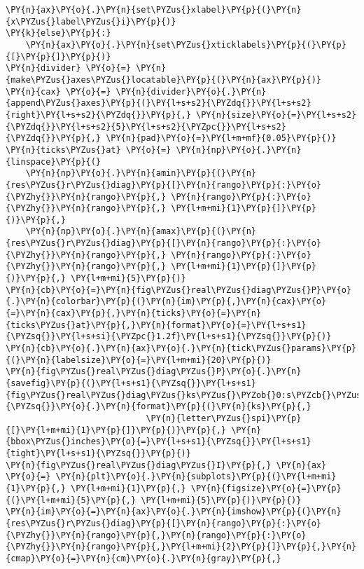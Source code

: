 \begin{Verbatim}[commandchars=\\\{\}]
    \PY{n}{ax}\PY{o}{.}\PY{n}{set\PYZus{}xlabel}\PY{p}{(}\PY{n}{x\PYZus{}label\PYZus{}i}\PY{p}{)}
\PY{k}{else}\PY{p}{:}
    \PY{n}{ax}\PY{o}{.}\PY{n}{set\PYZus{}xticklabels}\PY{p}{(}\PY{p}{[}\PY{p}{]}\PY{p}{)}
\PY{n}{divider} \PY{o}{=} \PY{n}{make\PYZus{}axes\PYZus{}locatable}\PY{p}{(}\PY{n}{ax}\PY{p}{)}
\PY{n}{cax} \PY{o}{=} \PY{n}{divider}\PY{o}{.}\PY{n}{append\PYZus{}axes}\PY{p}{(}\PY{l+s+s2}{\PYZdq{}}\PY{l+s+s2}{right}\PY{l+s+s2}{\PYZdq{}}\PY{p}{,} \PY{n}{size}\PY{o}{=}\PY{l+s+s2}{\PYZdq{}}\PY{l+s+s2}{5}\PY{l+s+s2}{\PYZpc{}}\PY{l+s+s2}{\PYZdq{}}\PY{p}{,} \PY{n}{pad}\PY{o}{=}\PY{l+m+mf}{0.05}\PY{p}{)}
\PY{n}{ticks\PYZus{}at} \PY{o}{=} \PY{n}{np}\PY{o}{.}\PY{n}{linspace}\PY{p}{(}
    \PY{n}{np}\PY{o}{.}\PY{n}{amin}\PY{p}{(}\PY{n}{res\PYZus{}r\PYZus{}diag}\PY{p}{[}\PY{n}{rango}\PY{p}{:}\PY{o}{\PYZhy{}}\PY{n}{rango}\PY{p}{,} \PY{n}{rango}\PY{p}{:}\PY{o}{\PYZhy{}}\PY{n}{rango}\PY{p}{,} \PY{l+m+mi}{1}\PY{p}{]}\PY{p}{)}\PY{p}{,}
    \PY{n}{np}\PY{o}{.}\PY{n}{amax}\PY{p}{(}\PY{n}{res\PYZus{}r\PYZus{}diag}\PY{p}{[}\PY{n}{rango}\PY{p}{:}\PY{o}{\PYZhy{}}\PY{n}{rango}\PY{p}{,} \PY{n}{rango}\PY{p}{:}\PY{o}{\PYZhy{}}\PY{n}{rango}\PY{p}{,} \PY{l+m+mi}{1}\PY{p}{]}\PY{p}{)}\PY{p}{,} \PY{l+m+mi}{5}\PY{p}{)}
\PY{n}{cb}\PY{o}{=}\PY{n}{fig\PYZus{}real\PYZus{}diag\PYZus{}P}\PY{o}{.}\PY{n}{colorbar}\PY{p}{(}\PY{n}{im}\PY{p}{,}\PY{n}{cax}\PY{o}{=}\PY{n}{cax}\PY{p}{,}\PY{n}{ticks}\PY{o}{=}\PY{n}{ticks\PYZus{}at}\PY{p}{,}\PY{n}{format}\PY{o}{=}\PY{l+s+s1}{\PYZsq{}}\PY{l+s+si}{\PYZpc{}1.2f}\PY{l+s+s1}{\PYZsq{}}\PY{p}{)}
\PY{n}{cb}\PY{o}{.}\PY{n}{ax}\PY{o}{.}\PY{n}{tick\PYZus{}params}\PY{p}{(}\PY{n}{labelsize}\PY{o}{=}\PY{l+m+mi}{20}\PY{p}{)}
\PY{n}{fig\PYZus{}real\PYZus{}diag\PYZus{}P}\PY{o}{.}\PY{n}{savefig}\PY{p}{(}\PY{l+s+s1}{\PYZsq{}}\PY{l+s+s1}{fig\PYZus{}real\PYZus{}diag\PYZus{}ks\PYZus{}\PYZob{}0:s\PYZcb{}\PYZus{}\PYZob{}1:s\PYZcb{}}\PY{l+s+s1}{\PYZsq{}}\PY{o}{.}\PY{n}{format}\PY{p}{(}\PY{n}{ks}\PY{p}{,}
                            \PY{n}{letter\PYZus{}spi}\PY{p}{[}\PY{l+m+mi}{1}\PY{p}{]}\PY{p}{)}\PY{p}{,} \PY{n}{bbox\PYZus{}inches}\PY{o}{=}\PY{l+s+s1}{\PYZsq{}}\PY{l+s+s1}{tight}\PY{l+s+s1}{\PYZsq{}}\PY{p}{)}
\PY{n}{fig\PYZus{}real\PYZus{}diag\PYZus{}I}\PY{p}{,} \PY{n}{ax} \PY{o}{=} \PY{n}{plt}\PY{o}{.}\PY{n}{subplots}\PY{p}{(}\PY{l+m+mi}{1}\PY{p}{,} \PY{l+m+mi}{1}\PY{p}{,} \PY{n}{figsize}\PY{o}{=}\PY{p}{(}\PY{l+m+mi}{5}\PY{p}{,} \PY{l+m+mi}{5}\PY{p}{)}\PY{p}{)}
\PY{n}{im}\PY{o}{=}\PY{n}{ax}\PY{o}{.}\PY{n}{imshow}\PY{p}{(}\PY{n}{res\PYZus{}r\PYZus{}diag}\PY{p}{[}\PY{n}{rango}\PY{p}{:}\PY{o}{\PYZhy{}}\PY{n}{rango}\PY{p}{,}\PY{n}{rango}\PY{p}{:}\PY{o}{\PYZhy{}}\PY{n}{rango}\PY{p}{,}\PY{l+m+mi}{2}\PY{p}{]}\PY{p}{,}\PY{n}{cmap}\PY{o}{=}\PY{n}{cm}\PY{o}{.}\PY{n}{gray}\PY{p}{,}

\end{Verbatim}
